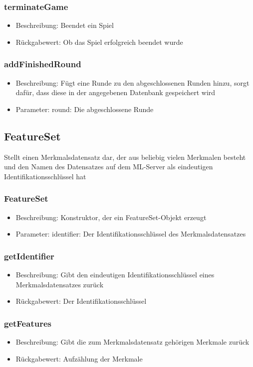 \documentclass[a4paper]{scrreprt}
\begin{document}
	\subsubsection{terminateGame}
	\begin{itemize}
		\item Beschreibung: Beendet ein Spiel
		\item Rückgabewert: Ob das Spiel erfolgreich beendet wurde
	\end{itemize}
	\subsubsection{addFinishedRound}
	\begin{itemize}
		\item Beschreibung: Fügt eine Runde zu den abgeschlossenen Runden hinzu, sorgt dafür, dass diese in der angegebenen Datenbank gespeichert wird
		\item Parameter: round: Die abgeschlossene Runde
	\end{itemize}

	\subsection{FeatureSet}
	Stellt einen Merkmalsdatensatz dar, der aus beliebig vielen Merkmalen besteht und den Namen des Datensatzes auf dem ML-Server als eindeutigen Identifikationsschlüssel hat
	\subsubsection{FeatureSet}
	\begin{itemize}
		\item Beschreibung: Konstruktor, der ein FeatureSet-Objekt erzeugt
		\item Parameter: identifier: Der Identifikationsschlüssel des Merkmalsdatensatzes
	\end{itemize}
	\subsubsection{getIdentifier}
	\begin{itemize}
		\item Beschreibung: Gibt den eindeutigen Identifikationsschlüssel eines Merkmalsdatensatzes zurück
		\item Rückgabewert: Der Identifikationsschlüssel
	\end{itemize}
	\subsubsection{getFeatures}
	\begin{itemize}
		\item Beschreibung: Gibt die zum Merkmalsdatensatz gehörigen Merkmale zurück
		\item Rückgabewert: Aufzählung der Merkmale
	\end{itemize}
\end{document}
